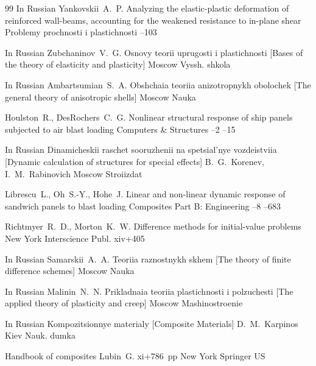 \begin{thebibliography}{99}
\lang In Russian
\by Yankovskii~A.~P.
\paper Analyzing the elastic-plastic deformation of reinforced wall-beams, accounting for the weakened resistance to in-plane shear
\jour Problemy prochnosti i plastichnosti
--103

\lang In Russian
\by Zubchaninov~V.~G.
\book Osnovy teorii uprugosti i plastichnosti \rm [Bases of the theory of elasticity and plasticity]
\publaddr Moscow
\publ Vyssh. shkola


\lang In Russian
\by Ambartsumian~S.~A.
\book Obshchaia teoriia anizotropnykh obolochek \rm [The general theory of anisotropic shells]
\publaddr Moscow
\publ Nauka


\by Houlston~R., DesRochers~C.~G.
\paper Nonlinear structural response of ship panels subjected to air blast loading
\jour Computers {\&} Structures
--2
--15

\lang In Russian
\book Dinamicheskii raschet sooruzhenii na spetsial'nye vozdeistviia \rm [Dynamic calculation of structures for special effects]
\ed B.~G.~Korenev, I.~M.~Rabinovich
\publaddr Moscow
\publ Stroiizdat

\by Librescu~L., Oh~S.-Y., Hohe~J.
\paper Linear and non-linear dynamic response of sandwich panels to blast loading
\jour  Composites Part B: Engineering 
--8
--683

\by Richtmyer~R.~D., Morton~K.~W.
\book Difference methods for initial-value problems
\publaddr New York
\publ Interscience Publ.
\totalpages  xiv+405

\lang In Russian
\by Samarskii~A.~A.
\book Teoriia raznostnykh skhem \rm [The theory of finite difference schemes]
\publaddr Moscow
\publ Nauka


\lang In Russian
\by Malinin~N.~N.
\book Prikladnaia teoriia plastichnosti i polzuchesti \rm [The applied theory of plasticity and creep]
\publaddr Moscow
\publ Mashinostroenie

\lang In Russian
\book Kompozitsionnye materialy \rm [Composite Materials]
\ed D.~M.~Karpinos
\publaddr Kiev
\publ Nauk. dumka



\book Handbook of composites
\by Lubin~G. 
\totalpages xi+786~pp \nofrills
{}
\publaddr New York
\publ Springer US


\end{thebibliography}

%
